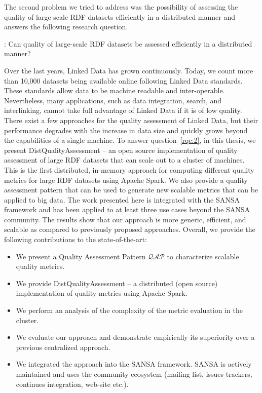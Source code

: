 The second problem we tried to address was the possibility of assessing the quality of large-scale RDF datasets efficiently in a distributed manner and answers the following research question.

\begin{tcolorbox}
\textbf{\rqNr[RQ2]\label{rqc:2}}: Can quality of large-scale RDF datasets be assessed efficiently in a distributed manner?
\end{tcolorbox}

Over the last years, Linked Data has grown continuously. 
Today, we count more than 10,000 datasets being available online following Linked Data standards. 
These standards allow data to be machine readable and inter-operable.  
Nevertheless, many applications, such as data integration, search, and interlinking, cannot take full advantage of Linked Data if it is of low quality.
There exist a few approaches for the quality assessment of Linked Data, but their performance degrades with the increase in data size and quickly grows beyond the capabilities of a single machine.
To answer question~\ref{rqc:2}, in this thesis, we present DistQualityAssessment -- an open source implementation of quality assessment of large RDF datasets that can scale out to a cluster of machines.
This is the first distributed, in-memory approach for computing different quality metrics for large RDF datasets using Apache Spark. We also provide a quality assessment pattern that can be used to generate new scalable metrics that can be applied to big data.
The work presented here is integrated with the SANSA framework and has been applied to at least three use cases beyond the SANSA community.   
The results show that our approach is more generic, efficient, and scalable as compared to previously proposed approaches.
Overall, we provide the following contributions to the state-of-the-art:
\begin{itemize}
    \item We present a Quality Assessment Pattern $\mathcal{QAP}$ to characterize scalable quality metrics.
    \item We provide DistQualityAssessment -- a distributed (open source) implementation of quality metrics using Apache Spark.
    \item We perform an analysis of the complexity of the metric evaluation in the cluster.
    \item We evaluate our approach and demonstrate empirically its superiority over a previous centralized approach.
    \item We integrated the approach into the SANSA framework.
    SANSA is actively maintained and uses the community ecosystem (mailing list, issues trackers, continues integration, web-site etc.).
\end{itemize}

